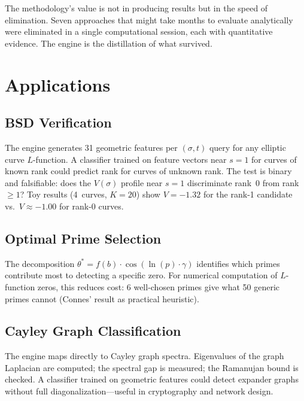 \documentclass[11pt]{amsart}
\begin{document}
The methodology's value is not in producing results but in the speed of
elimination. Seven approaches that might take months to evaluate analytically
were eliminated in a single computational session, each with quantitative
evidence. The engine is the distillation of what survived.


\section{Applications}
\label{sec:applications}

\subsection{BSD Verification}

The engine generates 31 geometric features per $(\sigma, t)$ query for any
elliptic curve $L$-function. A classifier trained on feature vectors near
$s = 1$ for curves of known rank could predict rank for curves of unknown
rank. The test is binary and falsifiable: does the $V(\sigma)$ profile near
$s = 1$ discriminate rank~0 from rank $\ge 1$? Toy results (4~curves,
$K=20$) show $V = -1.32$ for the rank-1 candidate vs.\
$V \approx -1.00$ for rank-0 curves.

\subsection{Optimal Prime Selection}

The decomposition $\theta^* = f(b)\cdot\cos(\ln(p)\cdot\gamma)$ identifies
which primes contribute most to detecting a specific zero. For numerical
computation of $L$-function zeros, this reduces cost: 6 well-chosen primes
give what 50 generic primes cannot (Connes' result as practical heuristic).

\subsection{Cayley Graph Classification}

The engine maps directly to Cayley graph spectra. Eigenvalues of the graph
Laplacian are computed; the spectral gap is measured; the Ramanujan bound is
checked. A classifier trained on geometric features could detect expander
graphs without full diagonalization---useful in cryptography and network
design.
\end{document}
